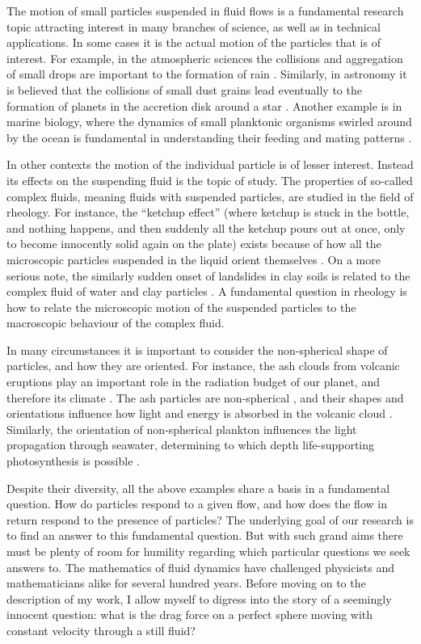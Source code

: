 \documentclass[thesis.tex]{subfiles}
\begin{document}
The motion of small particles suspended in fluid flows is a fundamental research topic attracting interest in many branches of science, as well as in technical applications. In some cases it is the actual motion of the particles that is of interest. For example, in the atmospheric sciences the collisions and aggregation of small drops are important to the formation of rain \cite{devenish2012}. Similarly, in astronomy it is believed that the collisions of small dust grains lead eventually to the formation of planets in the accretion disk around a star \cite{wilkinson2008}. Another example is in marine biology, where the dynamics of small planktonic organisms swirled around by the ocean is fundamental in understanding their feeding and mating patterns \cite{guasto2012}. 

In other contexts the motion of the individual particle is of lesser interest. Instead its effects on the suspending fluid is the topic of study. The properties of so-called complex fluids, meaning fluids with suspended particles, are studied in the field of rheology. For instance, the ``ketchup effect'' (where ketchup is stuck in the bottle, and nothing happens, and then suddenly all the ketchup pours out at once, only to become innocently solid again on the plate) exists because of how all the microscopic particles suspended in the liquid orient themselves \cite{bayod2008}. On a more serious note, the similarly sudden onset of landslides in clay soils is related to the complex fluid of water and clay particles \cite{coussot2002}. A fundamental question in rheology is how to relate the microscopic motion of the suspended particles to the macroscopic behaviour of the complex fluid.

In many circumstances it is important to consider the non-spherical shape of particles, and how they are oriented. For instance, the ash clouds from volcanic eruptions play an important role in the radiation budget of our planet, and therefore its climate \cite{mather2003}. The ash particles are non-spherical \cite{gasteiger2011}, and their shapes and orientations influence how light and energy is absorbed in the volcanic cloud \cite{dubovik2002}. Similarly, the orientation of non-spherical plankton influences the light propagation through seawater, determining to which depth life-supporting photosynthesis is possible \cite{marcos2011}. 

Despite their diversity, all the above examples share a basis in a fundamental question. How do particles respond to a given flow, and how does the flow in return respond to the presence of particles? The underlying goal of our research is to find an answer to this fundamental question. But with such grand aims there must be plenty of room for humility regarding which particular questions we seek answers to. The mathematics of fluid dynamics have challenged physicists and mathematicians alike for several hundred years. Before moving on to the description of my work, I allow myself to digress into the story of a seemingly innocent question: what is the drag force on a perfect sphere moving with constant velocity through a still fluid?
\end{document}
